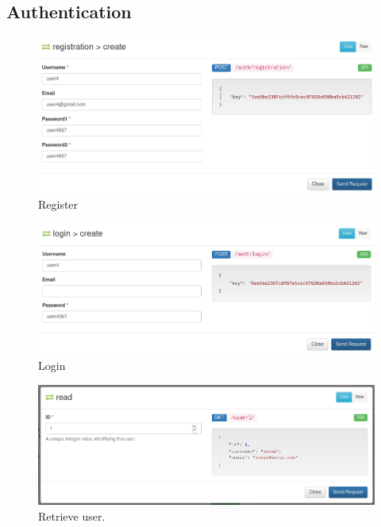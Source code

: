 \documentclass[11pt]{article}
\begin{document}
\subsection{Authentication}
\label{sec:org20c7d93}
\begin{figure}[htbp]
\centering
\includegraphics[width=.9\linewidth]{img/registration.png}
\caption{Register}
\end{figure}
\begin{figure}[htbp]
\centering
\includegraphics[width=.9\linewidth]{img/login.png}
\caption{Login}
\end{figure}
\begin{figure}[htbp]
	\centering
	\includegraphics[width=.9\linewidth]{img/get-user.png}
	\caption{Retrieve user.}
\end{figure}
\newpage
\end{document}

